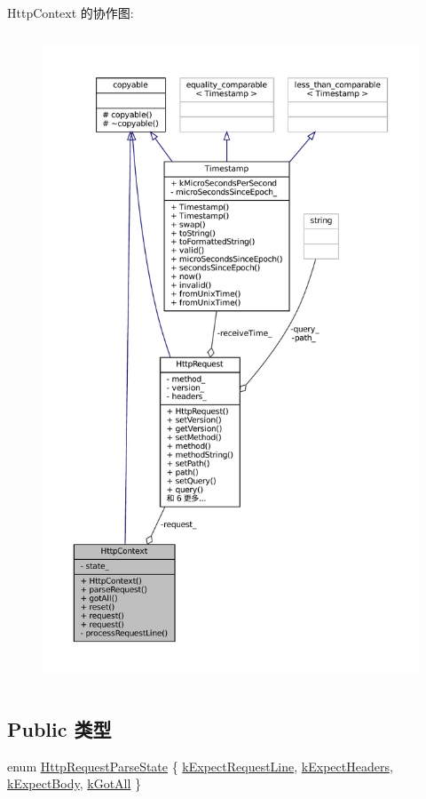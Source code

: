 Http\+Context 的协作图\+:
\nopagebreak
\begin{figure}[H]
\begin{center}
\leavevmode
\includegraphics[height=550pt]{classmuduo_1_1net_1_1HttpContext__coll__graph}
\end{center}
\end{figure}
\subsection*{Public 类型}
\begin{DoxyCompactItemize}
\item 
enum \hyperlink{classmuduo_1_1net_1_1HttpContext_ae45b4b16d3226e885f8f1b01481cdc97}{Http\+Request\+Parse\+State} \{ \hyperlink{classmuduo_1_1net_1_1HttpContext_ae45b4b16d3226e885f8f1b01481cdc97a90e524639e1fe13ced27233abea943a0}{k\+Expect\+Request\+Line}, 
\hyperlink{classmuduo_1_1net_1_1HttpContext_ae45b4b16d3226e885f8f1b01481cdc97a04cd6bfcf95d65f6574e2dd964296c2f}{k\+Expect\+Headers}, 
\hyperlink{classmuduo_1_1net_1_1HttpContext_ae45b4b16d3226e885f8f1b01481cdc97a84674a0d8e33557ae6498eca1ce114c4}{k\+Expect\+Body}, 
\hyperlink{classmuduo_1_1net_1_1HttpContext_ae45b4b16d3226e885f8f1b01481cdc97abc0630584582857fe8012b089eb24e15}{k\+Got\+All}
 \}
\end{DoxyCompactItemize}
